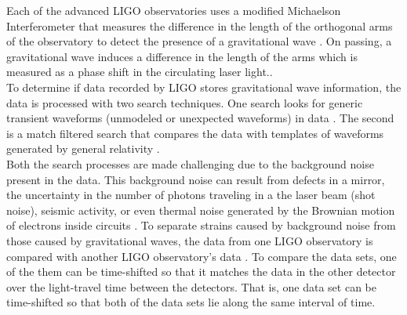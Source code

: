 \documentclass{article}
\begin{document}
 
 
 
 \indent Each of the advanced LIGO observatories uses a modified Michaelson Interferometer that measures the difference in the length of the orthogonal arms of the observatory to detect the presence of a gravitational wave \cite{DetectionPaper}. On passing, a gravitational wave induces a difference in the length of the arms which is measured as a phase shift in the circulating laser light.. \\
 
  
  \indent To determine if data recorded by LIGO stores gravitational wave information, the data is processed with two search techniques. One search looks for generic transient waveforms (unmodeled or unexpected waveforms) in data \cite{Enia}. The second is a match filtered search that compares the data with templates of waveforms generated by general relativity \cite{Enia}.\\
  
  
  
  
  
  \indent Both the search processes are made challenging due to the background noise present in the data.  This background noise can result from defects in a mirror, the uncertainty in the number of photons traveling in a the laser beam (shot noise), seismic activity, or even thermal noise generated by the Brownian motion of electrons inside circuits \cite{RSmith}. To separate  strains caused by background noise from those caused by gravitational waves, the data from one LIGO observatory is compared with another LIGO observatory's data \cite{DetectionPaper}. To compare the data sets, one of the them can be time-shifted so that it matches the data in the other detector over the light-travel time between the detectors. That is, one data set can be time-shifted so that both of the data sets lie along the same interval of time.\\
  
  
\end{document}
